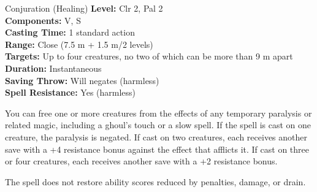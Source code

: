 {Conjuration (Healing)}
{
	\textbf{Level:}
	Clr 2, Pal 2\\
	\textbf{Components:}
	V, S\\
	\textbf{Casting Time:}
	1 standard action\\
	\textbf{Range:}
	Close (7.5 m + 1.5 m/2 levels)\\
	\textbf{Targets:}
	Up to four creatures, no two of which can be more than 9 m apart\\
	\textbf{Duration:}
	Instantaneous\\
	\textbf{Saving Throw:}
	Will negates (harmless)\\
	\textbf{Spell Resistance:}
	Yes (harmless)\\
}
{
	You can free one or more creatures from the effects of any temporary paralysis or related magic, including a ghoul's touch or a slow spell. If the spell is cast on one creature, the paralysis is negated. If cast on two creatures, each receives another save with a +4 resistance bonus against the effect that afflicts it. If cast on three or four creatures, each receives another save with a +2 resistance bonus.

	The spell does not restore ability scores reduced by penalties, damage, or drain.

}

